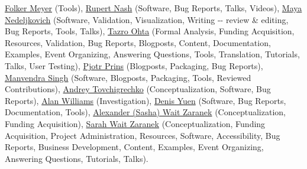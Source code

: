 \documentclass[sigconf,revew,screen,timestamp,nonacm]{acmart}
\newcommand{\contributor}[3]
{\normalsize\href{#1}{#2} \small(#3)\normalsize}
\begin{document}
\begin{acks}
\contributor{https://orcid.org/0000-0003-1112-2284}{Folker Meyer}{Tools},
\contributor{https://orcid.org/0000-0002-6388-7353}{Rupert Nash}{Software, Bug Reports, Talks, Videos},
\contributor{https://orcid.org/0000-0003-3705-948X}{Maya Nedeljkovich}{Software, Validation, Visualization, Writing -\/- review \& editing, Bug Reports, Tools, Talks},
\contributor{https://orcid.org/0000-0003-3777-5945}{Tazro Ohta}{Formal Analysis, Funding Acquisition, Resources, Validation, Bug Reports, Blogposts, Content, Documentation, Examples, Event Organizing, Answering Questions, Tools, Translation, Tutorials, Talks, User Testing},
\contributor{https://orcid.org/0000-0002-8021-9162}{Pjotr Prins}{Blogposts, Packaging, Bug Reports},
\contributor{https://orcid.org/0000-0001-9279-9910}{Manvendra Singh}{Software, Blogposts, Packaging, Tools, Reviewed Contributions},
\contributor{https://orcid.org/0000-0002-0959-4429}{Andrey Tovchigrechko}{Conceptualization, Software, Bug Reports},
\contributor{https://orcid.org/0000-0003-3156-2105}{Alan Williams}{Investigation},
\contributor{https://orcid.org/0000-0002-6130-1021}{Denis Yuen}{Software, Bug Reports, Documentation, Tools},
\contributor{https://orcid.org/0000-0002-0415-9655}{Alexander (Sasha) Wait Zaranek}{Conceptualization, Funding Acquisition},
\contributor{https://orcid.org/0000-0003-4716-9121}{Sarah Wait Zaranek}{Conceptualization, Funding Acquisition, Project Administration, Resources, Software, Accessibility, Bug Reports, Business Development, Content, Examples, Event Organizing, Answering Questions, Tutorials, Talks}.


\end{acks}
\end{document}
